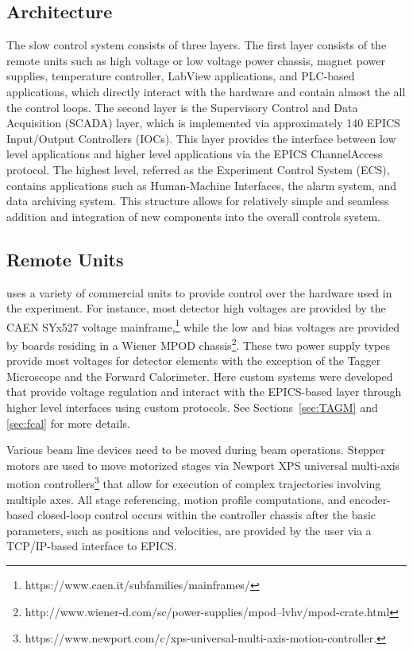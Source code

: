 \subsection{Architecture \label{sec:controlsarchitechture}}
The \gx{} slow control system consists of three layers. The first layer consists of the remote units such as high voltage or low voltage power chassis, magnet power supplies, temperature controller, LabView applications, and PLC-based applications, which directly interact with the hardware and contain almost the all the control loops. The second layer is the Supervisory Control and Data Acquisition (SCADA) layer, which is implemented via approximately 140 EPICS Input/Output Controllers (IOCs). This layer provides the interface between low level applications and higher level applications via the EPICS ChannelAccess protocol. The highest level, referred as the Experiment Control System (ECS), contains applications such as Human-Machine Interfaces, the alarm system, and data archiving system. This structure allows for relatively simple and seamless addition and integration of new components into the overall controls system.    

\subsection{Remote Units \label{sec:controlsinterface}}
\gx{} uses a variety of commercial units to provide control over the hardware used in the experiment. For instance, most detector high voltages are provided by the CAEN SYx527 voltage mainframe,\footnote{https://www.caen.it/subfamilies/mainframes/} while the low and bias voltages are provided by boards residing in a Wiener MPOD chassis\footnote{http://www.wiener-d.com/sc/power-supplies/mpod--lvhv/mpod-crate.html}. These two power supply types provide most voltages for detector elements with the exception of the Tagger Microscope and the Forward Calorimeter. Here custom systems were developed that provide voltage regulation and interact with the EPICS-based layer through higher level interfaces using custom protocols. See Sections~\ref{sec:TAGM} and \ref{sec:fcal} for more details.  

Various beam line devices need to be moved during beam operations. Stepper motors are used to move motorized stages via Newport XPS universal multi-axis motion controllers\footnote{https://www.newport.com/c/xps-universal-multi-axis-motion-controller.} that allow for execution of complex trajectories involving multiple axes. All stage referencing, motion profile computations, and encoder-based closed-loop control occurs within the controller chassis after the basic parameters, such as positions and velocities, are provided by the user via a TCP/IP-based interface to EPICS.   

